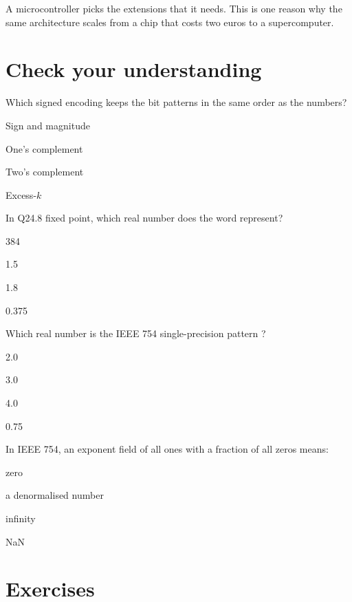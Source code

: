 A microcontroller picks the extensions that it needs. This is one reason why
the same architecture scales from a chip that costs two euros to a
supercomputer.





\section{Check your understanding}

\begin{quiz}{Which signed encoding keeps the bit patterns in the same order as the numbers?}
\item Sign and magnitude
\item One's complement
\item Two's complement
\item Excess-$k$
\end{quiz}

\begin{quiz}{In Q24.8 fixed point, which real number does the word  represent?}
\item 384
\item 1.5
\item 1.8
\item 0.375
\end{quiz}

\begin{quiz}{Which real number is the IEEE 754 single-precision pattern ?}
\item 2.0
\item 3.0
\item 4.0
\item 0.75
\end{quiz}

\begin{quiz}{In IEEE 754, an exponent field of all ones with a fraction of all zeros means:}
\item zero
\item a denormalised number
\item infinity
\item NaN
\end{quiz}

\section{Exercises}

